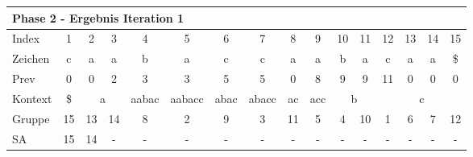 \begin{table}[H]
\centering
\begin{adjustbox}{max width=\textwidth}
\centering
\begin{tabular}{lccccccccccccccc}
\multicolumn{16}{l}{Phase 2 - Ergebnis Iteration 1}                                                                                                                                                                                                                                                                                                                   \\ \hline
\multicolumn{1}{l|}{Index}   & 1                                               & 2                          & 3                       & 4                          & 5                           & 6                         & 7                          & 8                       & 9                        & 10 & 11                      & 12  & 13  & 14  & 15  \\
\multicolumn{1}{l|}{Zeichen} & c                                               & a                          & a                       & b                          & a                           & c                         & c                          & a                       & a                        & b  & a                       & c   & a   & a   & \$  \\
\multicolumn{1}{l|}{Prev}    & 0                                               & 0                          & 2                       & 3                          & 3                           & 5                         & 5                          & 0                       & 8                        & 9  & 9                       & 11  & 0   & 0   & 0   \\ \hline
\multicolumn{1}{l|}{Kontext} & \multicolumn{1}{c|}{\$}                         & \multicolumn{2}{c|}{a}                               & \multicolumn{1}{c|}{aabac} & \multicolumn{1}{c|}{aabacc} & \multicolumn{1}{c|}{abac} & \multicolumn{1}{c|}{abacc} & \multicolumn{1}{c|}{ac} & \multicolumn{1}{c|}{acc} & \multicolumn{2}{c|}{b}       & \multicolumn{4}{c}{c} \\
\multicolumn{1}{l|}{Gruppe}  & \multicolumn{1}{c|}{15}                         & 13                         & \multicolumn{1}{c|}{14} & \multicolumn{1}{c|}{8}     & \multicolumn{1}{c|}{2}      & \multicolumn{1}{c|}{9}    & \multicolumn{1}{c|}{3}     & \multicolumn{1}{c|}{11} & \multicolumn{1}{c|}{5}   & 4  & \multicolumn{1}{c|}{10} & 1   & 6   & 7   & 12  \\
\multicolumn{1}{l|}{SA}      & \multicolumn{1}{c|}{\cellcolor[HTML]{\green}15} & \cellcolor[HTML]{\red}14 & \multicolumn{1}{c|}{-}  & \multicolumn{1}{c|}{-}     & \multicolumn{1}{c|}{-}      & \multicolumn{1}{c|}{-}    & \multicolumn{1}{c|}{-}     & \multicolumn{1}{c|}{-}  & \multicolumn{1}{c|}{-}   & -  & \multicolumn{1}{c|}{-}  & -   & -   & -   & -  
\end{tabular}
\end{adjustbox}


\end{table}
